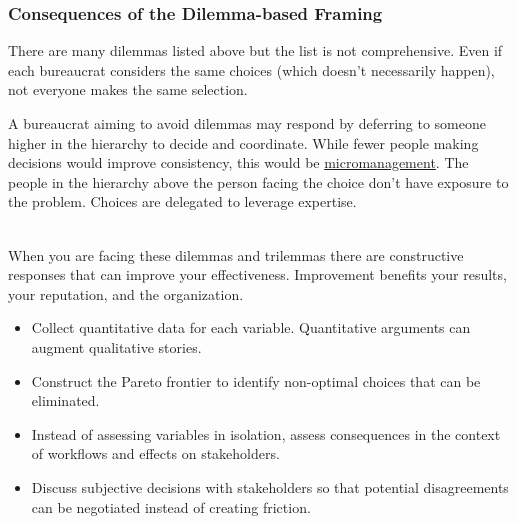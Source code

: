 \subsubsection*{Consequences of the Dilemma-based Framing}

There are many dilemmas listed above but the list is not comprehensive. Even if each bureaucrat considers the same choices (which doesn't necessarily happen), not everyone makes the same selection. 

A bureaucrat aiming to avoid dilemmas may respond by deferring to someone higher in the hierarchy to decide and coordinate. While fewer people making decisions would improve consistency, this would be \href{https://en.wikipedia.org/wiki/Micromanagement}{micromanagement}. 
The people in the hierarchy above the person facing the choice don't have exposure to the problem. Choices are delegated to leverage expertise. 

\ \\

When you are facing these dilemmas and trilemmas
there are constructive responses that can improve your effectiveness. Improvement benefits your results, your reputation, and the organization. 
\begin{itemize}
    \item Collect quantitative data for each variable. Quantitative arguments can augment qualitative stories. 
    \item Construct the Pareto frontier to identify non-optimal choices that can be eliminated.
    \item Instead of assessing variables in isolation, assess consequences in the context of workflows and effects on stakeholders.
    \item Discuss subjective decisions with stakeholders so that potential disagreements can be negotiated instead of creating friction.
\end{itemize}
 

